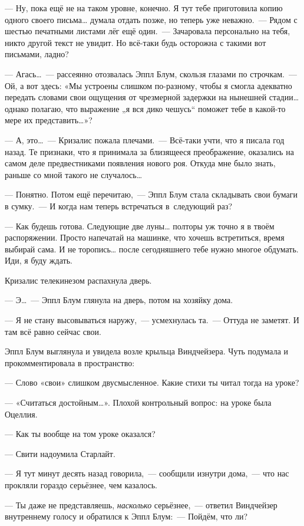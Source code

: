 \documentclass[fontsize=11pt,a5paper,titlepage=firstcover]{scrbook}
\begin{document}
--- Ну, пока ещё не на таком уровне, конечно. Я тут тебе приготовила копию одного своего письма{\ldots} думала отдать позже, но теперь уже неважно.~--- Рядом с шестью печатными листами лёг ещё один.~--- Зачаровала персонально на тебя, никто другой текст не увидит. Но всё-таки будь осторожна с такими вот письмами, ладно?

--- Агась{\ldots}~--- рассеянно отозвалась Эппл Блум, скользя глазами по строчкам.~--- Ой, а вот здесь: «Мы устроены слишком по-разному, чтобы я смогла адекватно передать словами свои ощущения от чрезмерной задержки на нынешней стадии{\ldots} однако полагаю, что выражение „я вся дико чешусь“ поможет тебе в какой-то мере их представить{\ldots}»?

--- А, это{\ldots}~--- Кризалис пожала плечами.~--- Всё-таки учти, что я писала год назад. Те признаки, что я принимала за близящееся преображение, оказались на самом деле предвестниками появления нового роя. Откуда мне было знать, раньше со мной такого не случалось{\ldots}

--- Понятно. Потом ещё перечитаю,~--- Эппл Блум стала складывать свои бумаги в сумку.~--- И когда нам теперь встречаться в~следующий раз?

--- Как будешь готова. Следующие две луны{\ldots} полторы уж точно я в твоём распоряжении. Просто напечатай на машинке, что хочешь встретиться, время выбирай сама. И не торопись{\ldots} после сегодняшнего тебе нужно многое обдумать. Иди, я буду ждать.

Кризалис телекинезом распахнула дверь.

--- Э{\ldots}~--- Эппл Блум глянула на дверь, потом на хозяйку дома.

--- Я не стану высовываться наружу,~--- усмехнулась та.~--- Оттуда не заметят. И там всё равно сейчас свои.

Эппл Блум выглянула и увидела возле крыльца Виндчейзера. Чуть подумала и прокомментировала в пространство:

--- Слово «свои» слишком двусмысленное. Какие стихи ты читал тогда на уроке?

--- «Считаться достойным{\ldots}». Плохой контрольный вопрос: на уроке была Оцеллия.

--- Как ты вообще на том уроке оказался?

--- Свити надоумила Старлайт.

--- Я тут минут десять назад говорила,~--- сообщили изнутри дома,~--- что нас прокляли гораздо серьёзнее, чем казалось.

--- Ты даже не представляешь, \emph{насколько} серьёзнее,~--- ответил Виндчейзер внутреннему голосу и обратился к Эппл Блум:~--- Пойдём, что ли?
\end{document}
